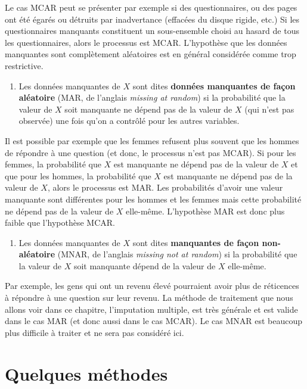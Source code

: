 \documentclass[
  11pt,
  letterpaper,
]{book}
\providecommand{\tightlist}{%
  \setlength{\itemsep}{0pt}\setlength{\parskip}{0pt}}
\theoremstyle{definition}
\theoremstyle{definition}
\theoremstyle{definition}
\theoremstyle{remark}
\begin{document}
Le cas MCAR peut se présenter par exemple si des questionnaires, ou des pages ont été égarés ou détruits par inadvertance (effacées du disque rigide, etc.) Si les questionnaires manquants constituent un sous-ensemble choisi au hasard de tous les questionnaires, alors le processus est MCAR. L'hypothèse que les données manquantes sont complètement aléatoires est en général considérée comme trop restrictive.

\begin{enumerate}
\def\labelenumi{\arabic{enumi})}
\setcounter{enumi}{1}
\tightlist
\item
  Les données manquantes de \(X\) sont dites \textbf{données manquantes de façon aléatoire} (MAR, de l'anglais \emph{missing at random}) si la probabilité que la valeur de \(X\) soit manquante ne dépend pas de la valeur de \(X\) (qui n'est pas observée) une fois qu'on a contrôlé pour les autres variables.
\end{enumerate}

Il est possible par exemple que les femmes refusent plus souvent que les hommes de répondre à une question (et donc, le processus n'est pas MCAR). Si pour les femmes, la probabilité que \(X\) est manquante ne dépend pas de la valeur de \(X\) et que pour les hommes, la probabilité que \(X\) est manquante ne dépend pas de la valeur de \(X\), alors le processus est MAR. Les probabilités d'avoir une valeur manquante sont différentes pour les hommes et les femmes mais cette probabilité ne dépend pas de la valeur de \(X\) elle-même. L'hypothèse MAR est donc plus faible que l'hypothèse MCAR.

\begin{enumerate}
\def\labelenumi{\arabic{enumi})}
\setcounter{enumi}{2}
\tightlist
\item
  Les données manquantes de \(X\) sont dites \textbf{manquantes de façon non-aléatoire} (MNAR, de l'anglais \emph{missing not at random}) si la probabilité que la valeur de \(X\) soit manquante dépend de la valeur de \(X\) elle-même.
\end{enumerate}

Par exemple, les gens qui ont un revenu élevé pourraient avoir plus de réticences à répondre à une question sur leur revenu. La méthode de traitement que nous allons voir dans ce chapitre, l'imputation multiple, est très générale et est valide dans le cas MAR (et donc aussi dans le cas MCAR). Le cas MNAR est beaucoup plus difficile à traiter et ne sera pas considéré ici.

\hypertarget{quelques-muxe9thodes}{%
\section{Quelques méthodes}\label{quelques-muxe9thodes}}
\end{document}
